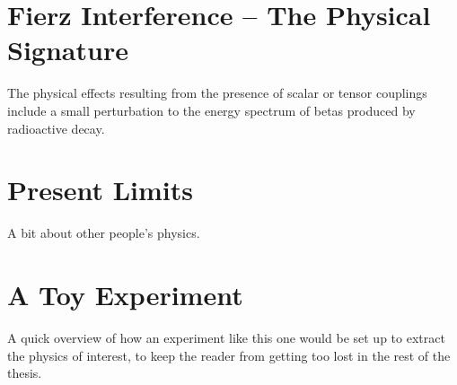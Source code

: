 \section{Fierz Interference -- The Physical Signature}
	The physical effects resulting from the presence of scalar or tensor couplings include a small perturbation to the energy spectrum of betas produced by radioactive decay.  


\section{Present Limits}
	A bit about other people's physics.

\section{A Toy Experiment}
	A quick overview of how an experiment like this one would be set up to extract the physics of interest, to keep the reader from getting too lost in the rest of the thesis.
